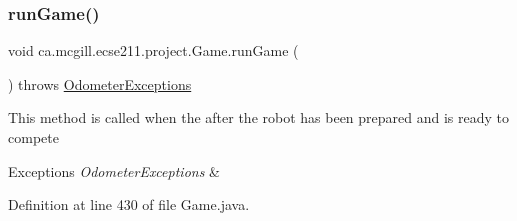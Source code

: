 \subsubsection{\texorpdfstring{run\+Game()}{runGame()}}
{\footnotesize\ttfamily void ca.\+mcgill.\+ecse211.\+project.\+Game.\+run\+Game (\begin{DoxyParamCaption}{ }\end{DoxyParamCaption}) throws \hyperlink{classca_1_1mcgill_1_1ecse211_1_1odometer_1_1_odometer_exceptions}{Odometer\+Exceptions}}

This method is called when the after the robot has been prepared and is ready to compete


\begin{DoxyExceptions}{Exceptions}
{\em Odometer\+Exceptions} & \\
\hline
\end{DoxyExceptions}


Definition at line 430 of file Game.\+java.


